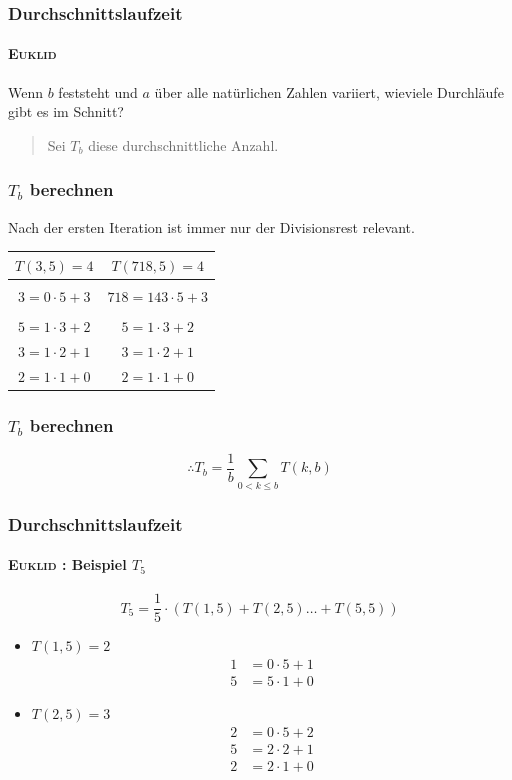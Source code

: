 \documentclass[•]{beamer}
\begin{document}
\begin{frame}
	\frametitle{Durchschnittslaufzeit}
	\framesubtitle{\textsc{Euklid}}
	Wenn $b$ feststeht und $a$ \"uber alle nat\"urlichen Zahlen variiert, wieviele Durchl\"aufe gibt es im Schnitt?\vspace{10pt}
	\begin{quote}
	Sei $T_{b}$ diese durchschnittliche Anzahl.
	\end{quote}
	\end{frame}
\begin{frame}
\frametitle{$T_b$ berechnen}
 Nach der ersten Iteration ist immer nur der Divisionsrest relevant.\vspace*{10pt}
 \begin{center}
 \begin{tabular}{|c|c|} \hline
 $T(3,5) = 4$ & $T(718,5) = 4$  \\ \hline
 	& \\
	$3=0\cdot 5 + 3$ & $718=143\cdot 5 + 3$ \\
	& \\
	$5=1\cdot 3 + 2$ & $5=1\cdot 3 + 2$ \\
	$3=1\cdot 2 + 1$ & $3=1\cdot 2 + 1$ \\
	$2=1\cdot 1 + 0$ & $2=1\cdot 1 + 0$ \\ \hline
	 \end{tabular}
	  \end{center}
\end{frame}
\begin{frame}
\frametitle{$T_b$ berechnen}
	$$\therefore T_{b} = \frac{1}{b} \sum_{0 < k\leq b} T(k,b)$$
	\end{frame}

\begin{frame}	
		\frametitle{Durchschnittslaufzeit}
	\framesubtitle{\textsc{Euklid} : Beispiel $T_5$}
$$T_5 = \frac{1}{5}\cdot (T(1,5) + T(2,5) \dots +T(5,5))$$	
	\begin{itemize}
	\item $T(1,5) = 2$
	\setcounter{equation}{0}
	\begin{align}
	1&=0\cdot 5 + 1	\\
	5&=5\cdot 1 + 0
	\end{align}
	
	\setcounter{equation}{0}
	\item $T(2,5) = 3$
	\begin{align}
	2&=0\cdot 5 + 2	\\
	5&=2\cdot 2 + 1 \\
	2&= 2\cdot 1+0
	\end{align}
	\end{itemize}
	
	\end{frame}
	
\end{document}
